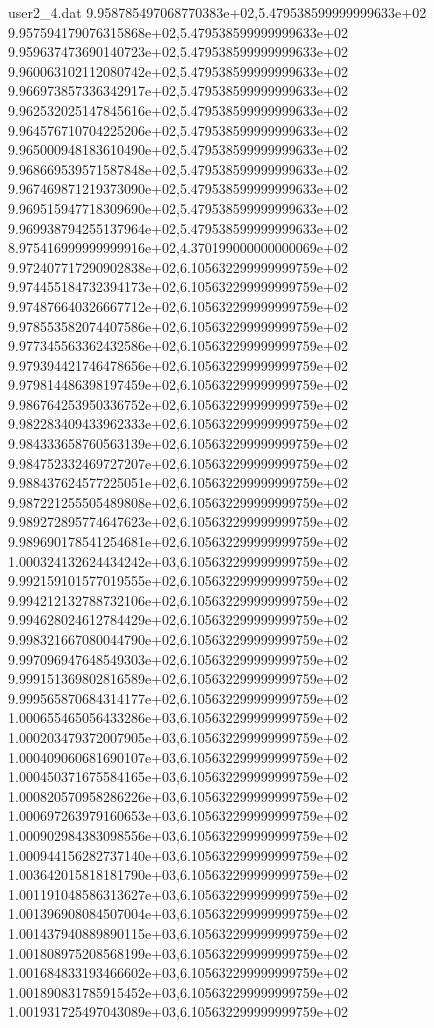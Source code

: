 \begin{filecontents}{user2_4.dat}
9.958785497068770383e+02,5.479538599999999633e+02
9.957594179076315868e+02,5.479538599999999633e+02
9.959637473690140723e+02,5.479538599999999633e+02
9.960063102112080742e+02,5.479538599999999633e+02
9.966973857336342917e+02,5.479538599999999633e+02
9.962532025147845616e+02,5.479538599999999633e+02
9.964576710704225206e+02,5.479538599999999633e+02
9.965000948183610490e+02,5.479538599999999633e+02
9.968669539571587848e+02,5.479538599999999633e+02
9.967469871219373090e+02,5.479538599999999633e+02
9.969515947718309690e+02,5.479538599999999633e+02
9.969938794255137964e+02,5.479538599999999633e+02
8.975416999999999916e+02,4.370199000000000069e+02
9.972407717290902838e+02,6.105632299999999759e+02
9.974455184732394173e+02,6.105632299999999759e+02
9.974876640326667712e+02,6.105632299999999759e+02
9.978553582074407586e+02,6.105632299999999759e+02
9.977345563362432586e+02,6.105632299999999759e+02
9.979394421746478656e+02,6.105632299999999759e+02
9.979814486398197459e+02,6.105632299999999759e+02
9.986764253950336752e+02,6.105632299999999759e+02
9.982283409433962333e+02,6.105632299999999759e+02
9.984333658760563139e+02,6.105632299999999759e+02
9.984752332469727207e+02,6.105632299999999759e+02
9.988437624577225051e+02,6.105632299999999759e+02
9.987221255505489808e+02,6.105632299999999759e+02
9.989272895774647623e+02,6.105632299999999759e+02
9.989690178541254681e+02,6.105632299999999759e+02
1.000324132624434242e+03,6.105632299999999759e+02
9.992159101577019555e+02,6.105632299999999759e+02
9.994212132788732106e+02,6.105632299999999759e+02
9.994628024612784429e+02,6.105632299999999759e+02
9.998321667080044790e+02,6.105632299999999759e+02
9.997096947648549303e+02,6.105632299999999759e+02
9.999151369802816589e+02,6.105632299999999759e+02
9.999565870684314177e+02,6.105632299999999759e+02
1.000655465056433286e+03,6.105632299999999759e+02
1.000203479372007905e+03,6.105632299999999759e+02
1.000409060681690107e+03,6.105632299999999759e+02
1.000450371675584165e+03,6.105632299999999759e+02
1.000820570958286226e+03,6.105632299999999759e+02
1.000697263979160653e+03,6.105632299999999759e+02
1.000902984383098556e+03,6.105632299999999759e+02
1.000944156282737140e+03,6.105632299999999759e+02
1.003642015818181790e+03,6.105632299999999759e+02
1.001191048586313627e+03,6.105632299999999759e+02
1.001396908084507004e+03,6.105632299999999759e+02
1.001437940889890115e+03,6.105632299999999759e+02
1.001808975208568199e+03,6.105632299999999759e+02
1.001684833193466602e+03,6.105632299999999759e+02
1.001890831785915452e+03,6.105632299999999759e+02
1.001931725497043089e+03,6.105632299999999759e+02

\end{filecontents}
